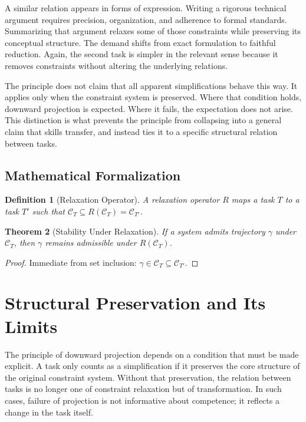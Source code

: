 \documentclass[12pt, a4paper]{article}
\newtheorem{definition}{Definition}[section]
\newtheorem{theorem}[definition]{Theorem}
\begin{document}
A similar relation appears in forms of expression. Writing a rigorous technical argument requires precision, organization, and adherence to formal standards. Summarizing that argument relaxes some of those constraints while preserving its conceptual structure. The demand shifts from exact formulation to faithful reduction. Again, the second task is simpler in the relevant sense because it removes constraints without altering the underlying relations.

The principle does not claim that all apparent simplifications behave this way. It applies only when the constraint system is preserved. Where that condition holds, downward projection is expected. Where it fails, the expectation does not arise. This distinction is what prevents the principle from collapsing into a general claim that skills transfer, and instead ties it to a specific structural relation between tasks.

\subsection*{Mathematical Formalization}

\begin{definition}[Relaxation Operator]
A relaxation operator $R$ maps a task $T$ to a task $T'$ such that $\mathcal{C}_T \subseteq R(\mathcal{C}_T) = \mathcal{C}_{T'}$.
\end{definition}

\begin{theorem}[Stability Under Relaxation]
If a system admits trajectory $\gamma$ under $\mathcal{C}_T$, then $\gamma$ remains admissible under $R(\mathcal{C}_T)$.
\end{theorem}

\begin{proof}
Immediate from set inclusion: $\gamma \in \mathcal{C}_T \subseteq \mathcal{C}_{T'}$.
\end{proof}


\section{Structural Preservation and Its Limits}

The principle of downward projection depends on a condition that must be made explicit. A task only counts as a simplification if it preserves the core structure of the original constraint system. Without that preservation, the relation between tasks is no longer one of constraint relaxation but of transformation. In such cases, failure of projection is not informative about competence; it reflects a change in the task itself.
\end{document}
